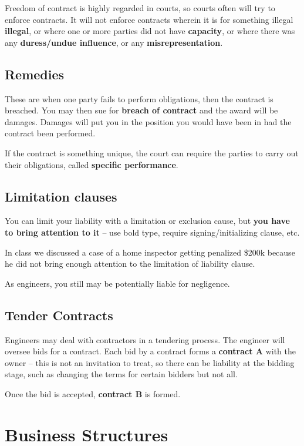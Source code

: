\documentclass{article}
\begin{document}
Freedom of contract is highly regarded in courts, so courts often will try to enforce contracts. It will not enforce contracts wherein it is for something illegal \textbf{illegal}, or where one or more parties did not have \textbf{capacity}, or where there was any \textbf{duress/undue influence}, or any \textbf{misrepresentation}.

\subsection{Remedies}

These are when one party fails to perform obligations, then the contract is breached. You may then sue for \textbf{breach of contract} and the award will be damages. Damages will put you in the position you would have been in had the contract been performed.

If the contract is something unique, the court can require the parties to carry out their obligations, called \textbf{specific performance}.


\subsection{Limitation clauses}

You can limit your liability with a limitation or exclusion cause, but \textbf{you have to bring attention to it} -- use bold type, require signing/initializing clause, etc.

In class we discussed a case of a home inspector getting penalized \$200k because he did not bring enough attention to the limitation of liability clause. 

As engineers, you still may be potentially liable for negligence.

\subsection{Tender Contracts}

Engineers may deal with contractors in a tendering process. The engineer will oversee bids for a contract. Each bid by a contract forms a \textbf{contract A} with the owner -- this is not an invitation to treat, so there can be liability at the bidding stage, such as changing the terms for certain bidders but not all. 

Once the bid is accepted, \textbf{contract B} is formed.

\section{Business Structures}
\end{document}
